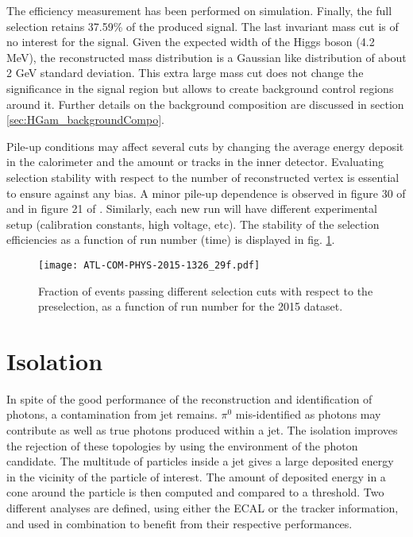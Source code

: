 The efficiency measurement has been performed on simulation.
Finally, the full selection retains 37.59\% of the produced signal.
The last invariant mass cut is of no interest for the signal.
Given the expected width of the Higgs boson (4.2 MeV), the reconstructed mass distribution is a Gaussian like distribution of about 2 GeV standard deviation.
This extra large mass cut does not change the significance in the signal region but allows to create background control regions around it.
Further details on the background composition are discussed in section \ref{sec:HGam_backgroundCompo}.

Pile-up conditions may affect several cuts by changing the average energy deposit in the calorimeter and the amount or tracks in the inner detector.
Evaluating selection stability with respect to the number of reconstructed vertex is essential to ensure against any bias.
A minor pile-up dependence is observed in figure 30 of \cite{ATL-COM-PHYS-2015-1326} and in figure 21 of \cite{ATL-COM-PHYS-2017-357}.
Similarly, each new run will have different experimental setup (calibration constants, high voltage, etc).
The stability of the selection efficiencies as a function of run number (time) is displayed in fig. \ref{fig:orgd7914c4}.

\begin{figure}[htbp]
\centering
\texttt{[image: ATL-COM-PHYS-2015-1326\_29f.pdf]}
\caption{\label{fig:orgd7914c4}
Fraction of events passing different selection cuts with respect to the preselection, as a function of run number for the 2015 dataset.\cite{ATL-COM-PHYS-2015-1326}}
\end{figure}

\section{Isolation}
\label{sec:org351c7b6}

In spite of the good performance of the reconstruction and identification of photons, a contamination from jet remains.
$\pi^0$ mis-identified as photons may contribute as well as true photons produced within a jet.
The isolation improves the rejection of these topologies by using the environment of the photon candidate.
The multitude of particles inside a jet gives a large deposited energy in the vicinity of the particle of interest.
The amount of deposited energy in a cone around the particle is then computed and compared to a threshold.
Two different analyses are defined, using either the ECAL or the tracker information, and used in combination to benefit from their respective performances.

